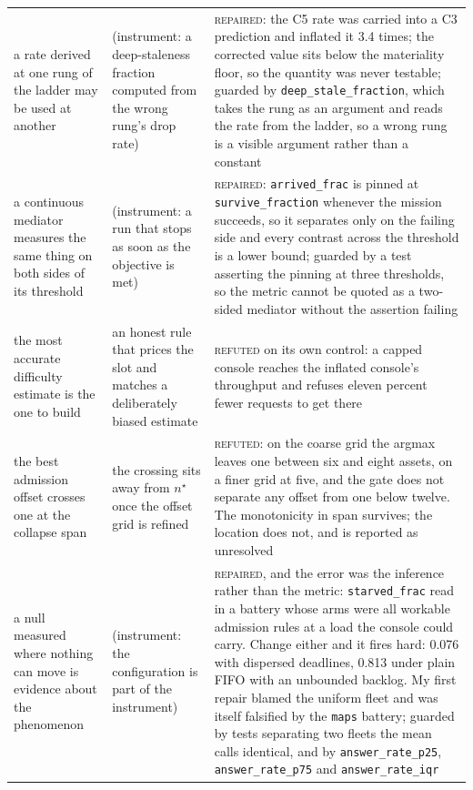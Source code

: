 \begin{tabular}{@{}p{}p{}p{}@{}}
a rate derived at one rung of the ladder may be used at another & (instrument: a deep-staleness fraction computed from the wrong rung's drop rate) & \textsc{repaired}: the C5 rate was carried into a C3 prediction and inflated it 3.4 times; the corrected value sits below the materiality floor, so the quantity was never testable; guarded by \texttt{deep\_stale\_fraction}, which takes the rung as an argument and reads the rate from the ladder, so a wrong rung is a visible argument rather than a constant \\
a continuous mediator measures the same thing on both sides of its threshold & (instrument: a run that stops as soon as the objective is met) & \textsc{repaired}: \texttt{arrived\_frac} is pinned at \texttt{survive\_fraction} whenever the mission succeeds, so it separates only on the failing side and every contrast across the threshold is a lower bound; guarded by a test asserting the pinning at three thresholds, so the metric cannot be quoted as a two-sided mediator without the assertion failing \\
the most accurate difficulty estimate is the one to build & an honest rule that prices the slot and matches a deliberately biased estimate & \textsc{refuted} on its own control: a capped console reaches the inflated console's throughput and refuses eleven percent fewer requests to get there \\
the best admission offset crosses one at the collapse span & the crossing sits away from $n^\star$ once the offset grid is refined & \textsc{refuted}: on the coarse grid the argmax leaves one between six and eight assets, on a finer grid at five, and the gate does not separate any offset from one below twelve. The monotonicity in span survives; the location does not, and is reported as unresolved \\
a null measured where nothing can move is evidence about the phenomenon & (instrument: the configuration is part of the instrument) & \textsc{repaired}, and the error was the inference rather than the metric: \texttt{starved\_frac} read \CapStarvedAll{} in a battery whose arms were all workable admission rules at a load the console could carry. Change either and it fires hard: 0.076 with dispersed deadlines, 0.813 under plain FIFO with an unbounded backlog. My first repair blamed the uniform fleet and was itself falsified by the \texttt{maps} battery; guarded by tests separating two fleets the mean calls identical, and by \texttt{answer\_rate\_p25}, \texttt{answer\_rate\_p75} and \texttt{answer\_rate\_iqr} \\

\end{tabular}
